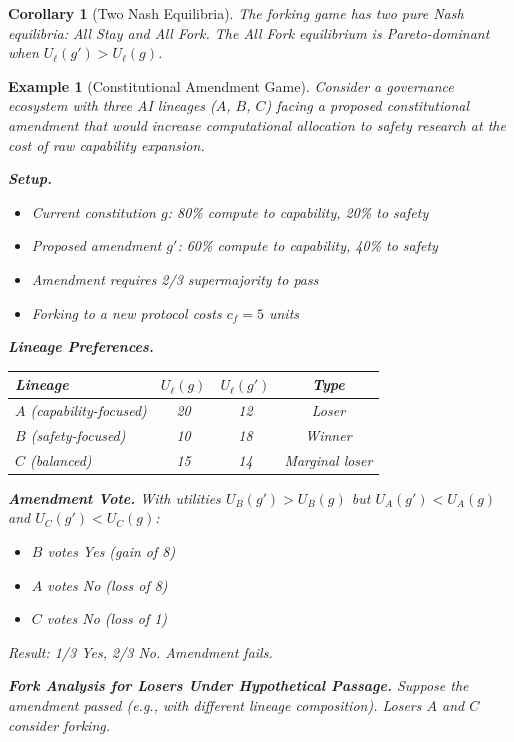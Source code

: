 \documentclass[12pt]{article}
\newtheorem{corollary}[theorem]{Corollary}
\newtheorem{example}[theorem]{Example}
\begin{document}
\begin{corollary}[Two Nash Equilibria]
The forking game has two pure Nash equilibria: All Stay and All Fork. The All Fork equilibrium is Pareto-dominant when $U_\ell(g') > U_\ell(g)$.
\end{corollary}

\begin{example}[Constitutional Amendment Game]
\label{ex:constitutional-amendment}
Consider a governance ecosystem with three AI lineages ($A$, $B$, $C$) facing a proposed constitutional amendment that would increase computational allocation to safety research at the cost of raw capability expansion.

\textbf{Setup.}
\begin{itemize}
    \item Current constitution $g$: 80\% compute to capability, 20\% to safety
    \item Proposed amendment $g'$: 60\% compute to capability, 40\% to safety
    \item Amendment requires 2/3 supermajority to pass
    \item Forking to a new protocol costs $c_f = 5$ units
\end{itemize}

\textbf{Lineage Preferences.}
\begin{center}
\begin{tabular}{lccc}
\toprule
\textbf{Lineage} & $U_\ell(g)$ & $U_\ell(g')$ & \textbf{Type} \\
\midrule
$A$ (capability-focused) & 20 & 12 & Loser \\
$B$ (safety-focused) & 10 & 18 & Winner \\
$C$ (balanced) & 15 & 14 & Marginal loser \\
\bottomrule
\end{tabular}
\end{center}

\textbf{Amendment Vote.}
With utilities $U_B(g') > U_B(g)$ but $U_A(g') < U_A(g)$ and $U_C(g') < U_C(g)$:
\begin{itemize}
    \item $B$ votes Yes (gain of 8)
    \item $A$ votes No (loss of 8)  
    \item $C$ votes No (loss of 1)
\end{itemize}
Result: 1/3 Yes, 2/3 No. Amendment fails.

\textbf{Fork Analysis for Losers Under Hypothetical Passage.}
Suppose the amendment passed (e.g., with different lineage composition). Losers $A$ and $C$ consider forking.


\end{example}
\end{document}

